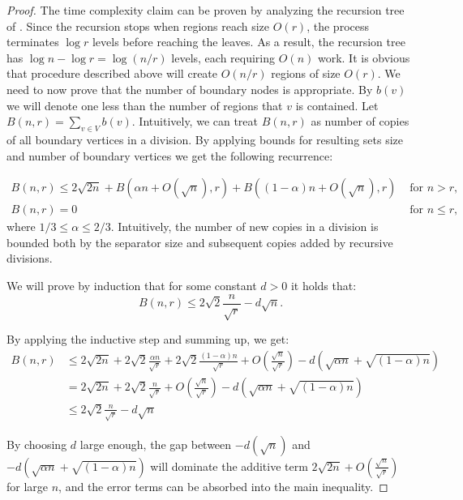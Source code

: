\begin{proof}
The time complexity claim can be proven by analyzing the recursion tree of . Since the recursion stops when regions reach size $O(r)$, the process terminates $\log r$ levels before reaching the leaves. As a result, the recursion tree has $\log n - \log r = \log(n/r)$ levels, each requiring $O(n)$ work.
It is obvious that procedure described above will create $O(n/r)$ regions of size $O(r)$. We need to now prove that the number of boundary nodes is appropriate.
By $b(v)$ we will denote one less than the number of regions that $v$ is contained. Let $B(n,r) = \sum_{v \in V} b(v)$. Intuitively, we can treat $B(n,r)$ as number of copies of all boundary vertices in a division. By applying bounds for resulting sets size and number of boundary vertices we get the following recurrence:

\begin{align*}
B(n,r) \leq 2 \sqrt{2n} + B(\alpha n + O(\sqrt{n}), r) + B((1-\alpha)n + O(\sqrt{n}), r)& \text{  for $n > r$},\\
B(n,r) = 0 & \text{ for $n \leq r$},
\end{align*}
where $1/3 \leq \alpha \leq 2/3$. Intuitively, the number of new copies in a division is bounded both by the separator size and subsequent copies added by recursive divisions.

We will prove by induction that for some constant $d > 0$ it holds that:
$$B(n,r) \leq 2\sqrt{2}\frac{n}{\sqrt{r}} - d\sqrt{n}.$$
    

By applying the inductive step and summing up, we get:
\begin{align*}
B(n, r) &\leq 2\sqrt{2n} + 2\sqrt{2}\frac{\alpha n}{\sqrt{r}} + 2\sqrt{2}\frac{(1-\alpha) n}{\sqrt{r}} + O\left(\frac{\sqrt{n}}{\sqrt{r}}\right) - d(\sqrt{\alpha n} + \sqrt{(1-\alpha)n}) \\
&= 2\sqrt{2n} + 2\sqrt{2}\frac{n}{\sqrt{r}} + O\left(\frac{\sqrt{n}}{\sqrt{r}}\right) - d(\sqrt{\alpha n} + \sqrt{(1-\alpha)n}) \\
&\leq 2\sqrt{2}\frac{n}{\sqrt{r}} - d\sqrt{n}
\end{align*}

By choosing $d$ large enough, the gap between $-d(\sqrt{n})$ and $-d(\sqrt{\alpha n} + \sqrt{(1-\alpha)n})$ will dominate the additive term $2\sqrt{2 n} + O\left(\frac{\sqrt{n}}{\sqrt{r}}\right)$ for large $n$, and the error terms can be absorbed into the main inequality.
\end{proof}

